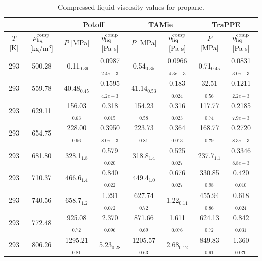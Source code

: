 \documentclass[preprint,review,12pt]{elsarticle}
\begin{document}
	\begin{table}[H]
		\caption{Compressed liquid viscosity values for propane.}
		\begin{center}
			\begin{tabular}{|c|c|c|c|c|c|c|c|}
				\hline
				            &                  & \multicolumn{2}{c|}{Potoff}     & \multicolumn{2}{c|}{TAMie}      & \multicolumn{2}{c|}{TraPPE}    \\ \hline
				$T$ {[}K{]} & $\rho^{\rm comp}_{\rm liq}$ {[}kg/m$^3${]} & $P$ {[}MPa{]}    & $\eta^{\rm comp}_{\rm liq}$ {[}Pa-s{]} & $P$ {[}MPa{]}    & $\eta^{\rm comp}_{\rm liq}$ {[}Pa-s{]} & $P$ {[}MPa{]}   & $\eta^{\rm comp}_{\rm liq}$ {[}Pa-s{]} \\ \hline
				293         & 500.28           & -0.11$_{0.39}$   & 0.0987$_{2.4e-3}$ & 0.54$_{0.35}$    & 0.0966$_{4.3e-3}$ & 0.71$_{0.45}$   & 0.0831$_{3.0e-3}$ \\ \hline
				293         & 559.78           & 40.48$_{0.45}$   & 0.1595$_{4.2e-3}$ & 41.14$_{0.53}$   & 0.183$_{0.024}$   & 32.51$_{0.56}$  & 0.1211$_{2.2e-3}$ \\ \hline
				293         & 629.11           & 156.03$_{0.63}$  & 0.318$_{0.015}$   & 154.23$_{0.58}$  & 0.316$_{0.023}$   & 117.77$_{0.74}$ & 0.2185$_{7.9e-3}$ \\ \hline
				293         & 654.75           & 228.00$_{0.96}$  & 0.3950$_{8.0e-3}$ & 223.73$_{0.81}$  & 0.364$_{0.013}$   & 168.77$_{0.79}$ & 0.2720$_{8.3e-3}$ \\ \hline
			    293         & 681.80           & 328.1$_{1.8}$    & 0.579$_{0.020}$   & 318.8$_{1.4}$    & 0.525$_{0.027}$   & 237.7$_{1.1}$   & 0.3346$_{8.8e-3}$ \\ \hline
				293         & 710.37           & 466.6$_{1.4}$    & 0.840$_{0.022}$   & 449.4$_{1.0}$    & 0.676$_{0.027}$   & 330.85$_{0.98}$ & 0.420$_{0.010}$   \\ \hline
				293         & 740.56           & 658.7$_{1.2}$    & 1.291$_{0.072}$   & 627.74$_{0.72}$  & 1.22$_{0.11}$     & 455.94$_{0.86}$ & 0.618$_{0.024}$   \\ \hline
				293         & 772.48           & 925.08$_{0.72}$  & 2.370$_{0.096}$   & 871.66$_{0.69}$  & 1.611$_{0.076}$   & 624.13$_{0.72}$ & 0.842$_{0.031}$   \\ \hline
				293         & 806.26           & 1295.21$_{0.81}$ & 5.23$_{0.28}$     & 1205.57$_{0.63}$ & 2.68$_{0.12}$     & 849.83$_{0.91}$ & 1.360$_{0.070}$   \\ \hline
				\end{tabular}
		\end{center}
	\end{table}
\end{document}
